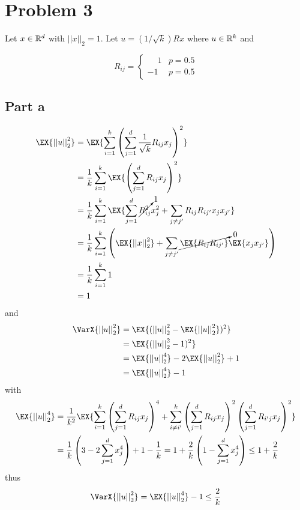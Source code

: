 \documentclass[12pt]{report}
\newcommand{\norm}[1]{\left|\left|#1\right|\right|}
\begin{document}
\section*{Problem 3}
Let $x \in \mathbb{R}^d$ with $\norm{x}_2 = 1$. Let $u = (1/\sqrt{k})Rx$ where $u \in \mathbb{R}^k$ and

\begin{equation*}
    R_{ij} = \begin{cases}
        \phantom{-}1 & p = 0.5 \\
        -1 & p = 0.5
    \end{cases}
\end{equation*}
\subsection*{Part a}
\begin{align*}
    \EX{\norm{u}_2^2} &= \EX{\sum_{i=1}^k\left(\sum_{j=1}^d \frac{1}{\sqrt{k}} R_{ij} x_j\right)^2} \\
    &= \frac{1}{k} \sum_{i=1}^k \EX{\left(\sum_{j=1}^d  R_{ij} x_j\right)^2} \\
    &= \frac{1}{k} \sum_{i=1}^k \EX{\sum_{j=1}^d  \cancelto{1}{R_{ij}^2} x_j^2 + \sum_{j\neq j'} R_{ij}R_{ij'}x_jx_{j'}} \\
    &= \frac{1}{k}\sum_{i=1}^k \left(\EX{\norm{x}_2^2} + \sum_{j\neq j'}\cancelto{0}{\EX{R_{ij}R_{ij'}}}\EX{x_jx_{j'}} \right) \\
    &= \frac{1}{k} \sum_{i=1}^k 1 \\
    &= 1
\end{align*}
and
\begin{align*}
    \VarX{\norm{u}_2^2} &= \EX{(\norm{u}_2^2 - \EX{\norm{u}_2^2})^2} \\
    &= \EX{(\norm{u}_2^2 - 1)^2} \\
    &= \EX{\norm{u}_2^4}- 2\EX{\norm{u}_2^2} + 1 \\
    &= \EX{\norm{u}_2^4} - 1
\end{align*}
with
\begin{align*}
    \EX{\norm{u}_2^4} &= \frac{1}{k^2}\EX{\sum_{i=1}^k\left(\sum_{j=1}^dR_{ij}x_j\right)^4 + \sum_{i \neq i'}^k \left(\sum_{j=1}^dR_{ij}x_j\right)^2 \left(\sum_{j=1}^dR_{i'j}x_j\right)^2} \\
    &= \frac{1}{k}\left(3 - 2\sum_{j=1}^dx_j^4\right) + 1 - \frac{1}{k} = 1 + \frac{2}{k}\left(1 - \sum_{j=1}^d x_j^4\right) \leq 1 + \frac{2}{k}
\end{align*}
thus 
\begin{equation*}
     \VarX{\norm{u}_2^2} = \EX{\norm{u}_2^4} - 1 \leq \frac{2}{k}
\end{equation*}
\end{document}
